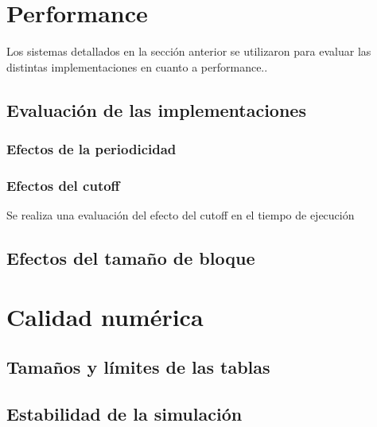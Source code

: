 \section{Performance}
Los sistemas detallados en la sección anterior se utilizaron para evaluar las distintas implementaciones en cuanto a performance..

\subsection{Evaluación de las implementaciones}


\subsubsection{Efectos de la periodicidad}

\subsubsection{Efectos del cutoff}
Se realiza una evaluación del efecto del cutoff en el tiempo de ejecución


\subsection{Efectos del tamaño de bloque}


\section{Calidad numérica}

\subsection{Tamaños y límites de las tablas}

\subsection{Estabilidad de la simulación}


